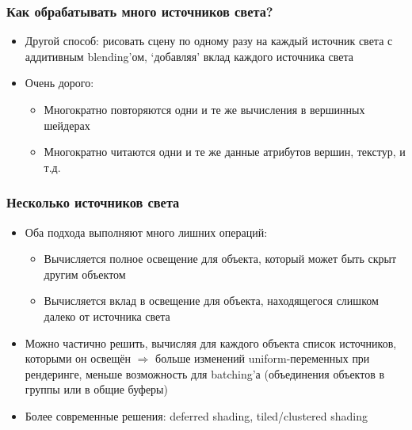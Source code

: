 \documentclass{beamer}
\begin{document}
\begin{frame}[fragile]
\frametitle{Как обрабатывать много источников света?}
\begin{itemize}
\item Другой способ: рисовать сцену по одному разу на каждый источник света с аддитивным blending'ом, `добавляя' вклад каждого источника света
\pause
\item Очень дорого:
\begin{itemize}
\item Многократно повторяются одни и те же вычисления в вершинных шейдерах
\item Многократно читаются одни и те же данные атрибутов вершин, текстур, и т.д.
\end{itemize}
\end{itemize}
\end{frame}

\begin{frame}[fragile]
\frametitle{Несколько источников света}
\begin{itemize}
\item Оба подхода выполняют много лишних операций:
\begin{itemize}
\item Вычисляется полное освещение для объекта, который может быть скрыт другим объектом
\pause
\item Вычисляется вклад в освещение для объекта, находящегося слишком далеко от источника света
\end{itemize}
\pause
\item Можно частично решить, вычисляя для каждого объекта список источников, которыми он освещён \begin{math}\Rightarrow\end{math} больше изменений uniform-переменных при рендеринге, меньше возможность для batching'а (объединения объектов в группы или в общие буферы)
\pause
\item Более современные решения: deferred shading, tiled/clustered shading
\end{itemize}
\end{frame}
\end{document}
